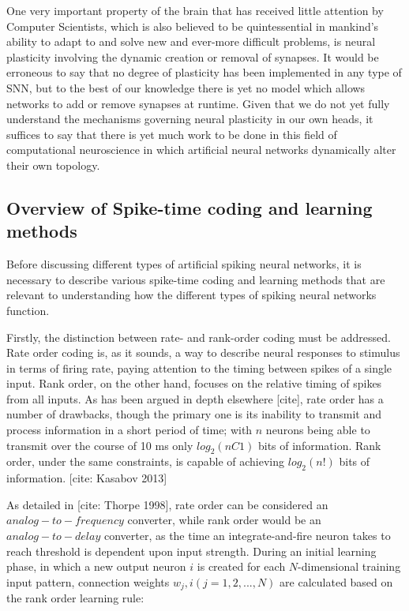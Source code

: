 \documentclass[journal]{./sty/IEEEtran}
\begin{document}
One very important property of the brain that has received little attention by Computer Scientists, which is also believed to be quintessential in mankind's ability to adapt to and solve new and ever-more difficult problems, is neural plasticity involving the dynamic creation or removal of synapses.
It would be erroneous to say that no degree of plasticity has been implemented in any type of SNN, but to the best of our knowledge there is yet no model which allows networks to add or remove synapses at runtime. 
Given that we do not yet fully understand the mechanisms governing neural plasticity in our own heads, it suffices to say that there is yet much work to be done in this field of computational neuroscience in which artificial neural networks dynamically alter their own topology.

\subsection{Overview of Spike-time coding and learning methods}
Before discussing different types of artificial spiking neural networks, it is necessary to describe various spike-time coding and learning methods that are relevant to understanding how the different types of spiking neural networks function.

Firstly, the distinction between rate- and rank-order coding must be addressed. 
Rate order coding is, as it sounds, a way to describe neural responses to stimulus in terms of firing rate, paying attention to the timing between spikes of a single input. 
Rank order, on the other hand, focuses on the relative timing of spikes from all inputs. 
As has been argued in depth elsewhere [cite], rate order has a number of drawbacks, though the primary one is its inability to transmit and process information in a short period of time; with \(n\) neurons being able to transmit over the course of 10 ms only $log_2(n C 1)$ bits of information.
Rank order, under the same constraints, is capable of achieving $log_2(n!)$ bits of information. [cite: Kasabov 2013]

As detailed in [cite: Thorpe 1998], rate order can be considered an $analog-to-frequency$ converter, while rank order would be an $analog-to-delay$ converter, as the time an integrate-and-fire neuron takes to reach threshold is dependent upon input strength. 
During an initial learning phase, in which a new output neuron $i$ is created for each $N$-dimensional training input pattern, connection weights $w_j,i (j = 1,2,...,N)$ are calculated based on the rank order learning rule:
\end{document}
